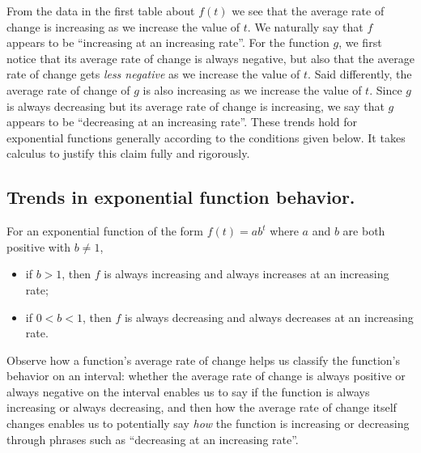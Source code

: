 \documentclass[nooutcomes]{ximera}
\begin{document}
From the data in the first table about $f(t)$ we see that the average rate of change is increasing as we increase the value of \(t\).  We naturally say that \(f\) appears to be ``increasing at an increasing rate''.  For the function \(g\), we first notice that its average rate of change is always negative, but also that the average rate of change gets \emph{less negative} as we increase the value of \(t\). Said differently, the average rate of change of \(g\) is also increasing as we increase the value of \(t\).  Since \(g\) is always decreasing but its average rate of change is increasing, we say that \(g\) appears to be ``decreasing at an increasing rate''.  These trends hold for exponential functions generally according to the conditions given below.  It takes calculus to justify this claim fully and rigorously. 

\begin{callout}
\section{Trends in exponential function behavior.}
For an exponential function of the form \(f(t) = ab^t\) where \(a\) and \(b\) are both positive with \(b \ne 1\),\leavevmode%
\begin{itemize}[label=\textbullet]
\item{}\hypertarget{p-1228}{}%
if \(b \gt 1\), then \(f\) is always increasing and always increases at an increasing rate;%
\item{}\hypertarget{p-1229}{}%
if \(0 \lt b \lt 1\), then \(f\) is always decreasing and always decreases at an increasing rate.%
\end{itemize}
\end{callout}

Observe how a function's average rate of change helps us classify the function's behavior on an interval:  whether the average rate of change is always positive or always negative on the interval enables us to say if the function is always increasing or always decreasing, and then how the average rate of change itself changes enables us to potentially say \emph{how} the function is increasing or decreasing through phrases such as ``decreasing at an increasing rate''.
\end{document}
